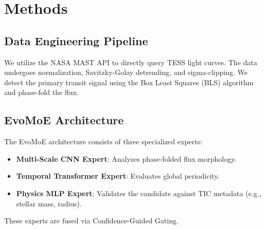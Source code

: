 \section{Methods}
\subsection{Data Engineering Pipeline}
We utilize the NASA MAST API to directly query TESS light curves. The data undergoes normalization, Savitzky-Golay detrending, and sigma-clipping. We detect the primary transit signal using the Box Least Squares (BLS) algorithm and phase-fold the flux.

\subsection{EvoMoE Architecture}
The EvoMoE architecture consists of three specialized experts:
\begin{itemize}
    \item \textbf{Multi-Scale CNN Expert}: Analyzes phase-folded flux morphology.
    \item \textbf{Temporal Transformer Expert}: Evaluates global periodicity.
    \item \textbf{Physics MLP Expert}: Validates the candidate against TIC metadata (e.g., stellar mass, radius).
\end{itemize}
These experts are fused via Confidence-Guided Gating.

